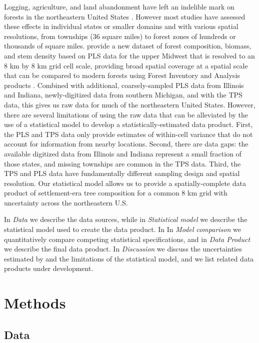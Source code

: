 \documentclass[10pt,letterpaper]{article}
\begin{document}
Logging, agriculture, and land abandonment have left an indelible
mark on forests in the northeastern United States \cite{foster1998land,rhemtulla2009legacies,thompson2013four,goring2015composition}.
However most studies have assessed these effects in individual states
or smaller domains \cite{friedman2005regional,rhemtulla2009historical}
and with various spatial resolutions, from townships (36 square miles)
to forest zones of hundreds or thousands of square miles. \cite{goring2015composition}
provide a new dataset of forest composition, biomass, and stem density
based on PLS data for the upper Midwest that is resolved to an 8 km
by 8 km grid cell scale, providing broad spatial coverage at a spatial
scale that can be compared to modern forests using Forest Inventory
and Analysis products \cite{gray2012forest}. Combined with additional,
coarsely-sampled PLS data from Illinois and Indiana, newly-digitized
data from southern Michigan, and with the TPS data, this gives us
raw data for much of the northeastern United States. However, there
are several limitations of using the raw data that can be alleviated
by the use of a statistical model to develop a statistically-estimated
data product. First, the PLS and TPS data only provide estimates of
within-cell variance that do not account for information from nearby
locations. Second, there are data gaps: the available digitized data
from Illinois and Indiana represent a small fraction of those states,
and missing townships are common in the TPS data. Third, the TPS and
PLS data have fundamentally different sampling design and spatial
resolution. Our statistical model allows us to provide a spatially-complete
data product of settlement-era tree composition for a common 8 km
grid with uncertainty across the northeastern U.S.

In \emph{Data} we describe the data sources, while in \emph{Statistical model} we describe 
the statistical model used to create the data product. In In \emph{Model comparison}
 we quantitatively compare competing
statistical specifications, and in \emph{Data Product}
we describe the final data product. In \emph{Discussion}
we discuss the uncertainties estimated by and the
limitations of the statistical model, and we list related data products
under development.

\section*{Methods}

\subsection*{Data\label{sec:Data}}
\end{document}
